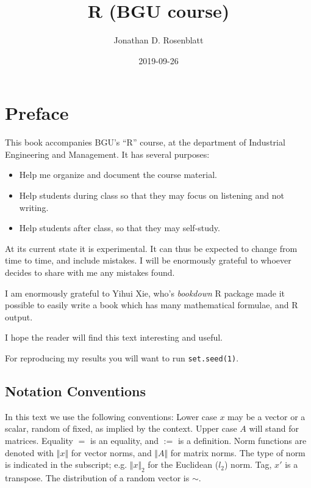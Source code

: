 \documentclass[]{book}
\title{R (BGU course)}
\author{Jonathan D. Rosenblatt}
\date{2019-09-26}
\providecommand{\tightlist}{%
  \setlength{\itemsep}{0pt}\setlength{\parskip}{0pt}}
\theoremstyle{definition}
\theoremstyle{definition}
\theoremstyle{definition}
\theoremstyle{remark}
\begin{document}
\maketitle

{
\setcounter{tocdepth}{1}
\tableofcontents
}
\hypertarget{preface}{%
\chapter{Preface}\label{preface}}

This book accompanies BGU's ``R'' course, at the department of Industrial Engineering and Management.
It has several purposes:

\begin{itemize}
\tightlist
\item
  Help me organize and document the course material.
\item
  Help students during class so that they may focus on listening and not writing.
\item
  Help students after class, so that they may self-study.
\end{itemize}

At its current state it is experimental.
It can thus be expected to change from time to time, and include mistakes.
I will be enormously grateful to whoever decides to share with me any mistakes found.

I am enormously grateful to Yihui Xie, who's \emph{bookdown} R package made it possible to easily write a book which has many mathematical formulae, and R output.

I hope the reader will find this text interesting and useful.

For reproducing my results you will want to run \texttt{set.seed(1)}.

\hypertarget{notation-conventions}{%
\section{Notation Conventions}\label{notation-conventions}}

In this text we use the following conventions:
Lower case \(x\) may be a vector or a scalar, random of fixed, as implied by the context.
Upper case \(A\) will stand for matrices.
Equality \(=\) is an equality, and \(:=\) is a definition.
Norm functions are denoted with \(\Vert x \Vert\) for vector norms, and \(\Vert A \Vert\) for matrix norms.
The type of norm is indicated in the subscript; e.g. \(\Vert x \Vert_2\) for the Euclidean (\(l_2\)) norm.
Tag, \(x'\) is a transpose.
The distribution of a random vector is \(\sim\).
\end{document}
